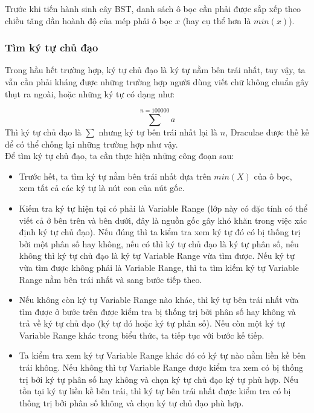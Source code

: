 \documentclass[a4paper,12pt]{article}
\begin{document}
	Trước khi tiến hành sinh cây BST, danh sách ô bọc cần phải được sắp xếp theo chiều tăng dần hoành độ của mép phải ô bọc $x$ (hay cụ thể hơn là $min(x)$). \\
	
	\subsubsection*{Tìm ký tự chủ đạo}
	
	Trong hầu hết trường hợp, ký tự chủ đạo là ký tự nằm bên trái nhất, tuy vậy, ta vẫn cần phải kháng được những trường hợp người dùng viết chữ không chuẩn gây thụt ra ngoài, hoặc những ký tự có dạng như:
	
	$$ \sum^{n = 100000} a $$
	Thì ký tự chủ đạo là $\sum$ nhưng ký tự bên trái nhất lại là $n$, Draculae được thế kế để có thể chống lại những trường hợp như vậy.\\
	
	Để tìm ký tự chủ đạo, ta cần thực hiện những công đoạn sau:
	\begin{itemize}
		\item Trước hết, ta tìm ký tự nằm bên trái nhất dựa trên $min(X)$ của ô bọc, xem tất cả các ký tự là nút con của nút gốc.
		\item Kiếm tra ký tự hiện tại có phải là Variable Range (lớp này có đặc tính có thể viết cả ở bên trên và bên dưới, đây là nguồn gốc gây khó khăn trong việc xác định ký tự chủ đạo). Nếu đúng thì ta kiểm tra xem ký tự đó có bị thống trị bởi một phân số hay không, nếu có thì ký tự chủ đạo là ký tự phân số, nếu không thì ký tự chủ đạo là ký tự Variable Range vừa tìm được. Nếu ký tự vừa tìm được không phải là Variable Range, thì ta tìm kiếm ký tự Variable Range nằm bên trái nhất và sang bước tiếp theo.
		
		\item Nếu không còn ký tự Variable Range nào khác, thì ký tự bên trái nhất vừa tìm được ở bước trên được kiểm tra bị thống trị bởi phân số hay không và trả về ký tự chủ đạo (ký tự đó hoặc ký tự phân số). Nếu còn một ký tự Variable Range khác trong biểu thức, ta tiếp tục với bước kế tiếp.
		
		\item Ta kiểm tra xem ký tự Variable Range khác đó có ký tự nào nằm liền kề bên trái không. Nếu không thì tự Variable Range được kiểm tra xem có bị thống trị bởi ký tự phân số hay không và chọn ký tự chủ đạo ký tự phù hợp. Nếu tồn tại ký tự liền kề bên trái, thì ký tự bên trái nhất được kiểm tra có bị thống trị bởi phân số không và chọn ký tự chủ đạo phù hợp.
		
	\end{itemize}
	
\end{document}
